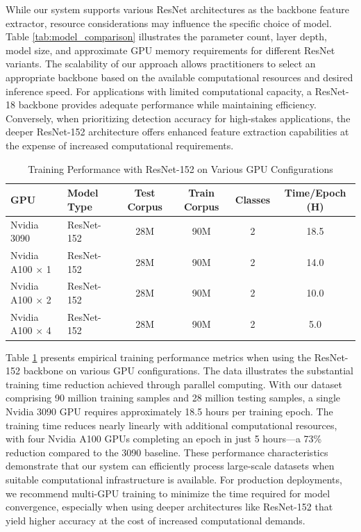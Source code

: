 \documentclass[conference]{IEEEtran}  %
\begin{document}
While our system supports various ResNet architectures as the backbone feature extractor, resource considerations may influence the specific choice of model. Table \ref{tab:model_comparison} illustrates the parameter count, layer depth, model size, and approximate GPU memory requirements for different ResNet variants. The scalability of our approach allows practitioners to select an appropriate backbone based on the available computational resources and desired inference speed. For applications with limited computational capacity, a ResNet-18 backbone provides adequate performance while maintaining efficiency. Conversely, when prioritizing detection accuracy for high-stakes applications, the deeper ResNet-152 architecture offers enhanced feature extraction capabilities at the expense of increased computational requirements.

\begin{table}[t]
\caption{Training Performance with ResNet-152 on Various GPU Configurations}
\label{tab:training_performance}
\centering
\begin{tabular}{|l|l|c|c|c|c|}
\hline
\textbf{GPU} & \textbf{Model Type} & \textbf{Test Corpus} & \textbf{Train Corpus} & \textbf{Classes} & \textbf{Time/Epoch (H)} \\
\hline
Nvidia 3090 & ResNet-152 & 28M & 90M & 2 & 18.5 \\
\hline
Nvidia A100 $\times$ 1 & ResNet-152 & 28M & 90M & 2 & 14.0 \\
\hline
Nvidia A100 $\times$ 2 & ResNet-152 & 28M & 90M & 2 & 10.0 \\
\hline
Nvidia A100 $\times$ 4 & ResNet-152 & 28M & 90M & 2 & 5.0 \\
\hline
\end{tabular}
\end{table}

Table \ref{tab:training_performance} presents empirical training performance metrics when using the ResNet-152 backbone on various GPU configurations. The data illustrates the substantial training time reduction achieved through parallel computing. With our dataset comprising 90 million training samples and 28 million testing samples, a single Nvidia 3090 GPU requires approximately 18.5 hours per training epoch. The training time reduces nearly linearly with additional computational resources, with four Nvidia A100 GPUs completing an epoch in just 5 hours—a 73\% reduction compared to the 3090 baseline. These performance characteristics demonstrate that our system can efficiently process large-scale datasets when suitable computational infrastructure is available. For production deployments, we recommend multi-GPU training to minimize the time required for model convergence, especially when using deeper architectures like ResNet-152 that yield higher accuracy at the cost of increased computational demands.
\end{document}
